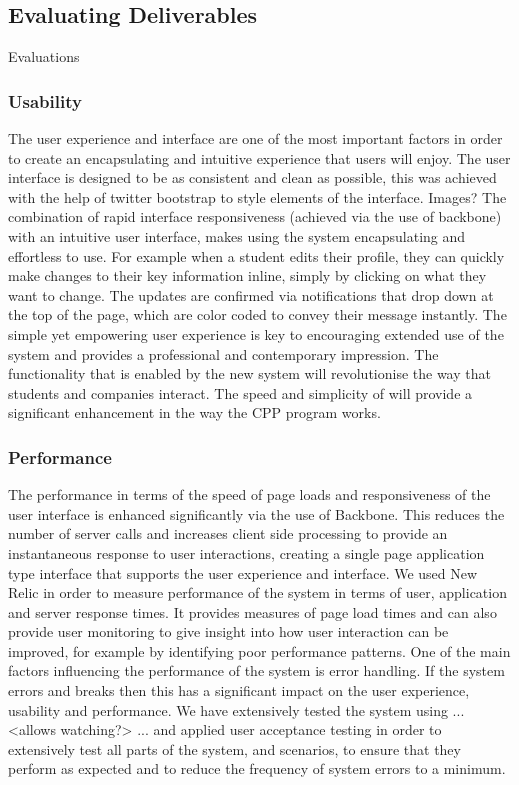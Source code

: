 \subsection{Evaluating Deliverables}
Evaluations
	\subsubsection{Usability}
		The user experience and interface are one of the most important factors in order to create an encapsulating and intuitive experience that users will enjoy. The user interface is designed to be as consistent and clean as possible, this was achieved with the help of twitter bootstrap to style elements of the interface.
Images?
The combination of rapid interface responsiveness (achieved via the use of backbone) with an intuitive user interface, makes using the system encapsulating and effortless to use. For example when a student edits their profile, they can quickly make changes to their key information inline, simply by clicking on what they want to change. The updates are confirmed via notifications that drop down at the top of the page, which are color coded to convey their message instantly. The simple yet empowering user experience is key to encouraging extended use of the system and provides a professional and contemporary impression. 
The functionality that is enabled by the new system will revolutionise the way that students and companies interact. The speed and simplicity of will provide a significant enhancement in the way the CPP program works.
	\subsubsection{Performance}
The performance in terms of the speed of page loads and responsiveness of the user interface is enhanced significantly via the use of Backbone. This reduces the number of server calls and increases client side processing to provide an instantaneous response to user interactions, creating a single page application type interface that supports the user experience and interface. We used New Relic in order to measure performance of the system in terms of user, application and server response times. It provides measures of page load times and can also provide user monitoring to give insight into how user interaction can be improved, for example by identifying poor performance patterns.
One of the main factors influencing the performance of the system is error handling. If the system errors and breaks then this has a significant impact on the user experience, usability and performance. We have extensively tested the system using ... <allows watching?> ... and applied user acceptance testing in order to extensively test all parts of the system, and scenarios, to ensure that they perform as expected and to reduce the frequency of system errors to a minimum.
